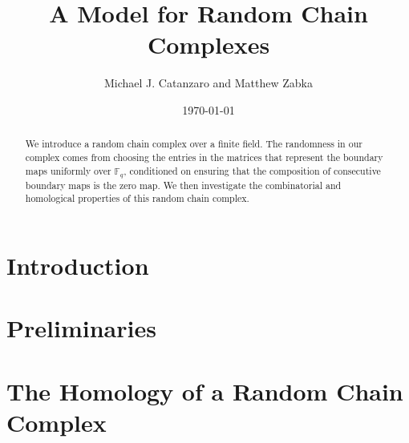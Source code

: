 \documentclass{amsart}
\title{A Model for Random Chain Complexes}
\author{Michael J. Catanzaro and Matthew Zabka}
\date{\today}
\begin{document}
\begin{abstract}
We introduce a random chain complex over a finite
field. The randomness in our complex comes from choosing the entries in the
matrices that represent the boundary maps uniformly over $\mathbb{F}_q$,
conditioned on ensuring that the composition of consecutive boundary maps is
the zero map.  We then investigate the combinatorial and homological 
properties of this random chain complex.
\end{abstract}
\maketitle


\section{Introduction}

\section{Preliminaries}

\section{The Homology of a Random Chain Complex}\label{SecCondComp}

%


  
\end{document}
